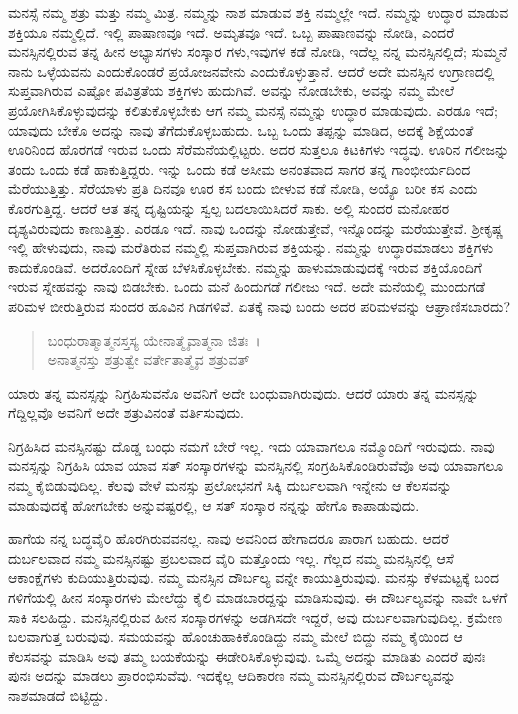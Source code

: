 ಮನಸ್ಸೆ ನಮ್ಮ ಶತ್ರು ಮತ್ತು ನಮ್ಮ ಮಿತ್ರ. ನಮ್ಮನ್ನು ನಾಶ ಮಾಡುವ ಶಕ್ತಿ ನಮ್ಮಲ್ಲೇ ಇದೆ. ನಮ್ಮನ್ನು ಉದ್ಧಾರ ಮಾಡುವ ಶಕ್ತಿಯೂ ನಮ್ಮಲ್ಲಿದೆ. ಇಲ್ಲಿ ಪಾಷಾಣವೂ ಇದೆ. ಅಮೃತವೂ ಇದೆ. ಒಬ್ಬ ಪಾಷಾಣವನ್ನು ನೋಡಿ, ಎಂದರೆ ಮನಸ್ಸಿನಲ್ಲಿರುವ ತನ್ನ ಹೀನ ಅಭ್ಯಾಸಗಳು ಸಂಸ್ಕಾರ ಗಳು,ಇವುಗಳ ಕಡೆ ನೋಡಿ, ಇದೆಲ್ಲ ನನ್ನ ಮನಸ್ಸಿನಲ್ಲಿದೆ; ಸುಮ್ಮನೆ ನಾನು ಒಳ್ಳೆಯವನು ಎಂದುಕೊಂಡರೆ ಪ್ರಯೋಜನವೇನು ಎಂದುಕೊಳ್ಳುತ್ತಾನೆ. ಆದರೆ ಅದೇ ಮನಸ್ಸಿನ ಉಗ್ರಾಣದಲ್ಲಿ ಸುಪ್ತವಾಗಿರುವ ಎಷ್ಟೋ ಪವಿತ್ರತೆಯ ಶಕ್ತಿಗಳು ಹುದುಗಿವೆ. ಅವನ್ನು ನೋಡಬೇಕು, ಅವನ್ನು ನಮ್ಮ ಮೇಲೆ ಪ್ರಯೋಗಿಸಿಕೊಳ್ಳುವುದನ್ನು ಕಲಿತುಕೊಳ್ಳಬೇಕು ಆಗ ನಮ್ಮ ಮನಸ್ಸೆ ನಮ್ಮನ್ನು ಉದ್ಧಾರ ಮಾಡುವುದು. ಎರಡೂ ಇದೆ; ಯಾವುದು ಬೇಕೊ ಅದನ್ನು ನಾವು ತೆಗೆದುಕೊಳ್ಳಬಹುದು. ಒಬ್ಬ ಒಂದು ತಪ್ಪನ್ನು ಮಾಡಿದ, ಅದಕ್ಕೆ ಶಿಕ್ಷೆಯಂತೆ ಊರಿನಿಂದ ಹೊರಗಡೆ ಇರುವ ಒಂದು ಸೆರೆಮನೆಯಲ್ಲಿಟ್ಟರು. ಅದರ ಸುತ್ತಲೂ ಕಿಟಕಿಗಳು ಇದ್ಧವು. ಊರಿನ ಗಲೀಜನ್ನು ತಂದು ಒಂದು ಕಡೆ ಹಾಕುತ್ತಿದ್ದರು. ಇನ್ನು ಒಂದು ಕಡೆ ಅಸೀಮ ಅನಂತವಾದ ಸಾಗರ ತನ್ನ ಗಾಂಭೀರ್ಯದಿಂದ ಮೆರೆಯುತ್ತಿತ್ತು. ಸೆರೆಯಾಳು ಪ್ರತಿ ದಿನವೂ ಊರ ಕಸ ಬಂದು ಬೀಳುವ ಕಡೆ ನೋಡಿ, ಅಯ್ಯೊ ಬರೀ ಕಸ ಎಂದು ಕೊರಗುತ್ತಿದ್ದ. ಆದರೆ ಆತ ತನ್ನ ದೃಷ್ಟಿಯನ್ನು ಸ್ವಲ್ಪ ಬದಲಾಯಿಸಿದರೆ ಸಾಕು. ಅಲ್ಲಿ ಸುಂದರ ಮನೋಹರ ದೃಶ್ಯವಿರುವುದು ಕಾಣುತ್ತಿತ್ತು. ಎರಡೂ ಇದೆ. ನಾವು ಒಂದನ್ನು ನೋಡುತ್ತೇವೆ, ಇನ್ನೊಂದನ್ನು ಮರೆಯುತ್ತೇವೆ. ಶ‍್ರೀಕೃಷ್ಣ ಇಲ್ಲಿ ಹೇಳುವುದು, ನಾವು ಮರೆತಿರುವ ನಮ್ಮಲ್ಲಿ ಸುಪ್ತವಾಗಿರುವ ಶಕ್ತಿಯನ್ನು. ನಮ್ಮನ್ನು ಉದ್ಧಾರಮಾಡಲು ಶಕ್ತಿಗಳು ಕಾದುಕೊಂಡಿವೆ. ಅದರೊಂದಿಗೆ ಸ್ನೇಹ ಬೆಳಸಿಕೊಳ್ಳಬೇಕು. ನಮ್ಮನ್ನು ಹಾಳುಮಾಡುವುದಕ್ಕೆ ಇರುವ ಶಕ್ತಿಯೊಂದಿಗೆ ಇರುವ ಸ್ನೇಹವನ್ನು ನಾವು ಬಿಡಬೇಕು. ಒಂದು ಮನೆ ಹಿಂದುಗಡೆ ಗಲೀಜು ಇದೆ. ಅದೇ ಮನೆಯಲ್ಲಿ ಮುಂದುಗಡೆ ಪರಿಮಳ ಬೀರುತ್ತಿರುವ ಸುಂದರ ಹೂವಿನ ಗಿಡಗಳಿವೆ. ಏತಕ್ಕೆ ನಾವು ಬಂದು ಅದರ ಪರಿಮಳವನ್ನು ಆಘ್ರಾಣಿಸಬಾರದು?

\begin{verse}
ಬಂಧುರಾತ್ಮಾತ್ಮನಸ್ತಸ್ಯ ಯೇನಾತ್ಮೈವಾತ್ಮನಾ ಜಿತಃ~।\\ಅನಾತ್ಮನಸ್ತು ಶತ್ರುತ್ವೇ ವರ್ತೇತಾತ್ಮೈವ ಶತ್ರುವತ್ 
\end{verse}

{\small ಯಾರು ತನ್ನ ಮನಸ್ಸನ್ನು ನಿಗ್ರಹಿಸುವನೊ ಅವನಿಗೆ ಅದೇ ಬಂಧುವಾಗಿರುವುದು. ಆದರೆ ಯಾರು ತನ್ನ ಮನಸ್ಸನ್ನು ಗೆದ್ದಿಲ್ಲವೊ ಅವನಿಗೆ ಅದೇ ಶತ್ರುವಿನಂತೆ ವರ್ತಿಸುವುದು.}

ನಿಗ್ರಹಿಸಿದ ಮನಸ್ಸಿನಷ್ಟು ದೊಡ್ಡ ಬಂಧು ನಮಗೆ ಬೇರೆ ಇಲ್ಲ. ಇದು ಯಾವಾಗಲೂ ನಮ್ಮೊಂದಿಗೆ ಇರುವುದು. ನಾವು ಮನಸ್ಸನ್ನು ನಿಗ್ರಹಿಸಿ ಯಾವ ಯಾವ ಸತ್ ಸಂಸ್ಕಾರಗಳನ್ನು ಮನಸ್ಸಿನಲ್ಲಿ ಸಂಗ್ರಹಿಸಿಕೊಂಡಿರುವೆವೊ ಅವು ಯಾವಾಗಲೂ ನಮ್ಮ ಕೈಬಿಡುವುದಿಲ್ಲ. ಕೆಲವು ವೇಳೆ ಮನಸ್ಸು ಪ್ರಲೋಭನಗೆ ಸಿಕ್ಕಿ ದುರ್ಬಲವಾಗಿ ಇನ್ನೇನು ಆ ಕೆಲಸವನ್ನು ಮಾಡುವುದಕ್ಕೆ ಹೋಗಬೇಕು ಅನ್ನುವಷ್ಟರಲ್ಲಿ, ಆ ಸತ್ ಸಂಸ್ಕಾರ ನನ್ನನ್ನು ಹೇಗೊ ಕಾಪಾಡುವುದು.

ಹಾಗೆಯ ನನ್ನ ಬದ್ಧವೈರಿ ಹೊರಗಿರುವವನಲ್ಲ. ನಾವು ಅವನಿಂದ ಹೇಗಾದರೂ ಪಾರಾಗ ಬಹುದು. ಆದರೆ ದುರ್ಬಲವಾದ ನಮ್ಮ ಮನಸ್ಸಿನಷ್ಟು ಪ್ರಬಲವಾದ ವೈರಿ ಮತ್ತೊಂದು ಇಲ್ಲ. ಗೆಲ್ಲದ ನಮ್ಮ ಮನಸ್ಸಿನಲ್ಲಿ ಆಸೆ ಆಕಾಂಕ್ಷೆಗಳು ಕುದಿಯುತ್ತಿರುವುವು. ನಮ್ಮ ಮನಸ್ಸಿನ ದೌರ್ಬಲ್ಯ ವನ್ನೇ ಕಾಯುತ್ತಿರುವುವು. ಮನಸ್ಸು ಕೆಳಮಟ್ಟಕ್ಕೆ ಬಂದ ಗಳಿಗೆಯಲ್ಲಿ ಹೀನ ಸಂಸ್ಕಾರಗಳು ಮೇಲೆದ್ದು ಕೈಲಿ ಮಾಡಬಾರದ್ದನ್ನು ಮಾಡಿಸುವುವು. ಈ ದೌರ್ಬಲ್ಯವನ್ನು ನಾವೇ ಒಳಗೆ ಸಾಕಿ ಸಲಹಿದ್ದು. ಮನಸ್ಸಿನಲ್ಲಿರುವ ಹೀನ ಸಂಸ್ಕಾರಗಳನ್ನು ಅಡಗಿಸದೇ ಇದ್ದರೆ, ಅವು ದುರ್ಬಲವಾಗುವುದಿಲ್ಲ. ಕ್ರಮೇಣ ಬಲವಾಗುತ್ತ ಬರುವುವು. ಸಮಯವನ್ನು ಹೊಂಚುಹಾಕಿಕೊಂಡಿದ್ದು ನಮ್ಮ ಮೇಲೆ ಬಿದ್ದು ನಮ್ಮ ಕೈಯಿಂದ ಆ ಕೆಲಸವನ್ನು ಮಾಡಿಸಿ ಅವು ತಮ್ಮ ಬಯಕೆಯನ್ನು ಈಡೇರಿಸಿಕೊಳ್ಳುವುವು. ಒಮ್ಮೆ ಅದನ್ನು ಮಾಡಿತು ಎಂದರೆ ಪುನಃ ಪುನಃ ಅದನ್ನು ಮಾಡಲು ಪ್ರಾರಂಭಿಸುವೆವು. ಇದಕ್ಕೆಲ್ಲ ಆದಿಕಾರಣ ನಮ್ಮ ಮನಸ್ಸಿನಲ್ಲಿರುವ ದೌರ್ಬಲ್ಯವನ್ನು ನಾಶಮಾಡದೆ ಬಿಟ್ಟಿದ್ದು.

